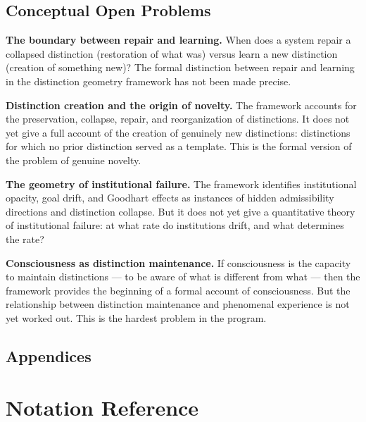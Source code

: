 \documentclass[12pt,a4paper]{book}
\theoremstyle{remark}
\theoremstyle{definition}
\begin{document}
\section{Conceptual Open Problems}

\textbf{The boundary between repair and learning.} When does a system
repair a collapsed distinction (restoration of what was) versus learn a
new distinction (creation of something new)? The formal distinction
between repair and learning in the distinction geometry framework has
not been made precise.

\textbf{Distinction creation and the origin of novelty.} The framework
accounts for the preservation, collapse, repair, and reorganization of
distinctions. It does not yet give a full account of the creation of
genuinely new distinctions: distinctions for which no prior distinction
served as a template. This is the formal version of the problem of
genuine novelty.

\textbf{The geometry of institutional failure.} The framework identifies
institutional opacity, goal drift, and Goodhart effects as instances of
hidden admissibility directions and distinction collapse. But it does
not yet give a quantitative theory of institutional failure: at what
rate do institutions drift, and what determines the rate?

\textbf{Consciousness as distinction maintenance.} If consciousness is
the capacity to maintain distinctions --- to be aware of what is different
from what --- then the framework provides the beginning of a formal
account of consciousness. But the relationship between distinction
maintenance and phenomenal experience is not yet worked out. This is
the hardest problem in the program.

\newpage

\section*{Appendices}
\appendix

\chapter{Notation Reference}
\end{document}
